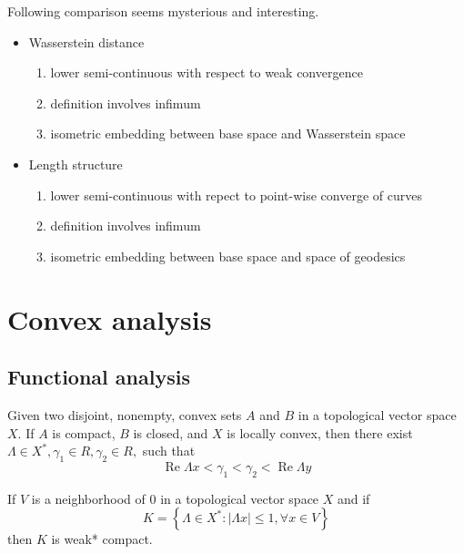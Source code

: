 \begin{rmk} 
	Following comparison seems mysterious and interesting.
	\begin{itemize}
		\item Wasserstein distance
		      \begin{enumerate}
			      \item lower semi-continuous with respect to weak convergence
			      \item definition involves infimum
			      \item isometric embedding between base space and Wasserstein space
		      \end{enumerate}
		\item Length structure
		      \begin{enumerate}
			      \item lower semi-continuous with repect to point-wise converge of curves
			      \item definition involves infimum
			      \item isometric embedding between base space and space of geodesics
		      \end{enumerate}
	\end{itemize}
\end{rmk}

\section{Convex analysis}

\subsection{Functional analysis}

\begin{thm}
	Given two disjoint, nonempty, convex sets $A$ and $B$ in a topological vector space $X$. If \( A \) is compact, \( B \) is closed, and \( X \) is locally convex, then there exist \( \Lambda \in X ^ { * } , \gamma _ { 1 } \in R , \gamma _ { 2 } \in R , \) such that
	\[
		\operatorname { Re } \Lambda x < \gamma _ { 1 } < \gamma _ { 2 } < \operatorname { Re } \Lambda y
	\]
\end{thm}

\begin{thm}
If \( V \) is a neighborhood of 0 in a topological vector space \( X \) and if
\[ K = \left\{ \Lambda \in X ^ { * }: | \Lambda x | \leq 1, \forall x \in V \right\} \]
then $K$ is weak* compact.
\end{thm}

